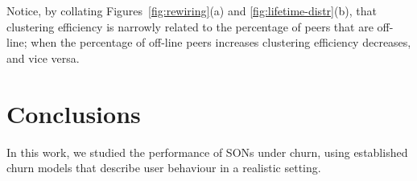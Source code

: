 \documentclass{llncs}
\begin{document}
Notice, by collating Figures~\ref{fig:rewiring}(a) and \ref{fig:lifetime-distr}(b), that clustering efficiency is narrowly related to the percentage of peers that are off-line; when the percentage of off-line peers increases clustering efficiency decreases, and vice versa.


\section{Conclusions}\label{sec:conclusion}
In this work, we studied the performance of SONs under churn, using established churn models that describe user behaviour in a realistic setting.


\end{document}
